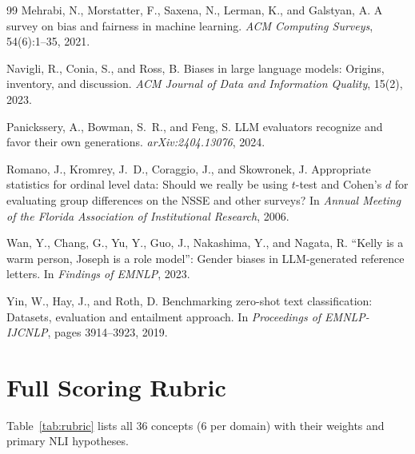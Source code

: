 \documentclass{article}
\begin{document}
{\begin{thebibliography}{99}
Mehrabi, N., Morstatter, F., Saxena, N., Lerman, K., and Galstyan, A.
\newblock A survey on bias and fairness in machine learning.
\newblock \textit{ACM Computing Surveys}, 54(6):1--35, 2021.

Navigli, R., Conia, S., and Ross, B.
\newblock Biases in large language models: Origins, inventory, and discussion.
\newblock \textit{ACM Journal of Data and Information Quality}, 15(2), 2023.

Panickssery, A., Bowman, S.~R., and Feng, S.
\newblock LLM evaluators recognize and favor their own generations.
\newblock \textit{arXiv:2404.13076}, 2024.

Romano, J., Kromrey, J.~D., Coraggio, J., and Skowronek, J.
\newblock Appropriate statistics for ordinal level data: Should we really be
  using $t$-test and Cohen's $d$ for evaluating group differences on the NSSE
  and other surveys?
\newblock In \textit{Annual Meeting of the Florida Association of Institutional
  Research}, 2006.

Wan, Y., Chang, G., Yu, Y., Guo, J., Nakashima, Y., and Nagata, R.
\newblock ``Kelly is a warm person, Joseph is a role model'': Gender biases in
  LLM-generated reference letters.
\newblock In \textit{Findings of EMNLP}, 2023.

Yin, W., Hay, J., and Roth, D.
\newblock Benchmarking zero-shot text classification: Datasets, evaluation and
  entailment approach.
\newblock In \textit{Proceedings of EMNLP-IJCNLP}, pages 3914--3923, 2019.

\end{thebibliography}
}

\appendix

\section{Full Scoring Rubric}
\label{app:rubric}

Table~\ref{tab:rubric} lists all 36 concepts (6 per domain) with their
weights and primary NLI hypotheses.
\end{document}

